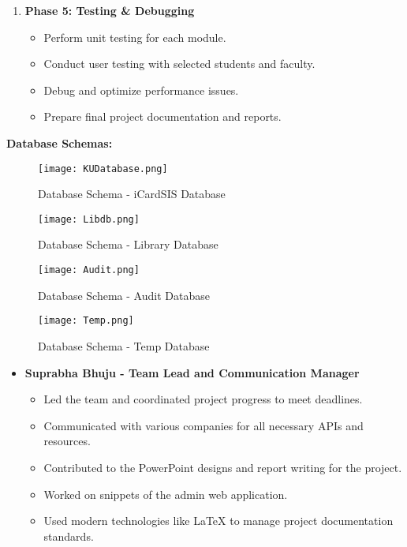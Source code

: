 \documentclass[a4paper,14pt]{article}
\begin{document}
{{{{{{\begin{enumerate}
				\item \textbf{Phase 5: Testing \& Debugging }
				\begin{itemize}
					\item Perform unit testing for each module.
					\item Conduct user testing with selected students and faculty.
					\item Debug and optimize performance issues.
					\item Prepare final project documentation and reports.
				\end{itemize}
				
			\end{enumerate}
		\vspace{0.5cm}    
			\newpage
		\noindent \textbf{Database Schemas:}
		\begin{figure}[h!]
			\centering
			\texttt{[image: KUDatabase.png]}
			\caption{Database Schema - iCardSIS Database}
			\label{fig:Database Schema - iCardSIS Database}
		\end{figure}
		\begin{figure}[h!]
			\centering
			\texttt{[image: Libdb.png]}
			\caption{Database Schema - Library Database}
			\label{fig:Database Schema - Library Database}
		\end{figure}
		\newpage
		\begin{figure}[h!]
			\centering
			\texttt{[image: Audit.png]}
			\caption{Database Schema - Audit Database}
			\label{fig:Database Schema - Audit Database}
		\end{figure}
		\begin{figure}[h!]
			\centering
			\texttt{[image: Temp.png]}
			\caption{Database Schema - Temp Database}
			\label{fig:Database Schema - Temp Database}
		\end{figure}
		\newpage
		{
			\noindent \normalsize
			\justifying \begin{itemize}
				\item \textbf{Suprabha Bhuju - Team Lead and Communication Manager}
				\begin{itemize}
					\item Led the team and coordinated project progress to meet deadlines.
					\item Communicated with various companies for all necessary APIs and resources.
					\item Contributed to the PowerPoint designs and report writing for the project.
					\item Worked on snippets of the admin web application.
					\item Used modern technologies like \LaTeX{} to manage project documentation standards.
				\end{itemize}
				

\end{itemize}}}}}}}}
\end{document}
